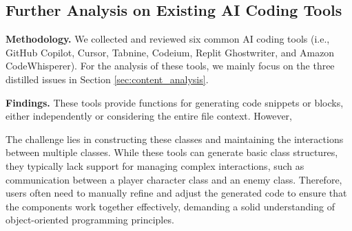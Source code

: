 \subsection{Further Analysis on Existing AI Coding Tools}
\textbf{Methodology.} We collected and reviewed six common AI coding tools (i.e., GitHub Copilot, Cursor, Tabnine, Codeium, Replit Ghostwriter, and Amazon CodeWhisperer). For the analysis of these tools, we mainly focus on the {three distilled} issues %
in Section \ref{sec:content_analysis}. %

\textbf{Findings.}
These tools provide functions for generating code snippets or blocks, {either} %
independently or considering the entire file context. However, %

The challenge lies in constructing these classes and maintaining the interactions 
between multiple classes. While these tools can generate basic class structures, they typically lack support for managing complex interactions, such as communication between a player character class and an enemy class. {Therefore,} %
users often need to manually refine and adjust the generated code to ensure that the components work together effectively, {demanding} %
a solid understanding of object-oriented programming principles.


